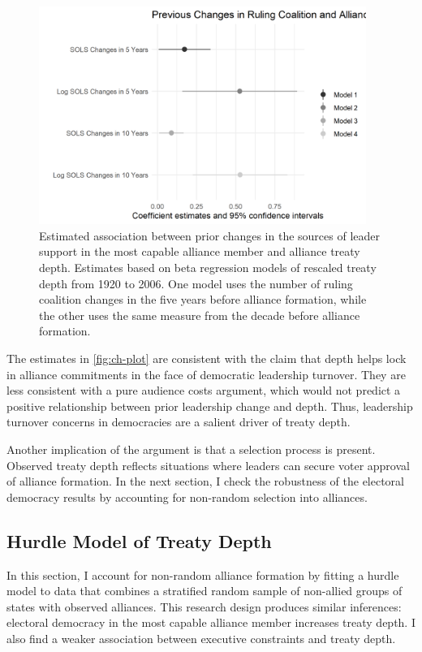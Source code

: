 \documentclass[12pt]{article}
\begin{document}
\begin{figure}[hbtp]
\centering
\includegraphics[width=0.95\textwidth]{../figures/ch-plot.png}
\caption{Estimated association between prior changes in the sources of leader support in the most capable alliance member and alliance treaty depth. Estimates based on beta regression models of rescaled treaty depth from 1920 to 2006. One model uses the number of ruling coalition changes in the five years before alliance formation, while the other uses the same measure from the decade before alliance formation.}
\label{fig:ch-plot}
\end{figure}


The estimates in \autoref{fig:ch-plot} are consistent with the claim that depth helps lock in alliance commitments in the face of democratic leadership turnover.
They are less consistent with a pure audience costs argument, which would not predict a positive relationship between prior leadership change and depth.   
Thus, leadership turnover concerns in democracies are a salient driver of treaty depth. 
 

Another implication of the argument is that a selection process is present. 
Observed treaty depth reflects situations where leaders can secure voter approval of alliance formation.
In the next section, I check the robustness of the electoral democracy results by accounting for non-random selection into alliances. 


\subsection{Hurdle Model of Treaty Depth} 


In this section, I account for non-random alliance formation by fitting a hurdle model to data that combines a stratified random sample of non-allied groups of states with observed alliances. 
This research design produces similar inferences: electoral democracy in the most capable alliance member increases treaty depth. 
I also find a weaker association between executive constraints and treaty depth. 
\end{document}
